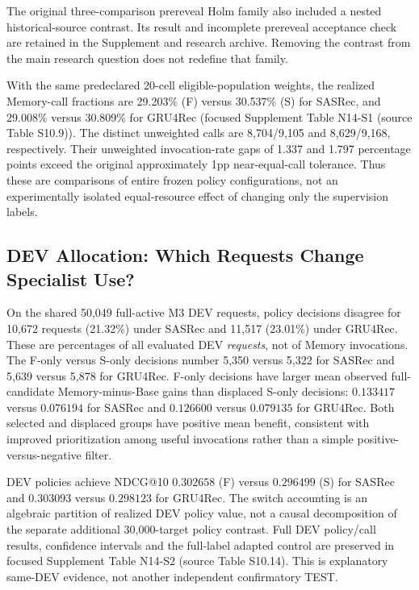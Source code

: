 \documentclass[preprint,12pt]{elsarticle}
\begin{document}
The original three-comparison prereveal Holm family also included a nested historical-source contrast. Its result and incomplete prereveal acceptance check are retained in the Supplement and research archive. Removing the contrast from the main research question does not redefine that family.

With the same predeclared 20-cell eligible-population weights, the realized Memory-call fractions are 29.203\% (F) versus 30.537\% (S) for SASRec, and 29.008\% versus 30.809\% for GRU4Rec (focused Supplement Table N14-S1 (source Table S10.9)). The distinct unweighted calls are 8,704/9,105 and 8,629/9,168, respectively. Their unweighted invocation-rate gaps of 1.337 and 1.797 percentage points exceed the original approximately 1pp near-equal-call tolerance. Thus these are comparisons of entire frozen policy configurations, not an experimentally isolated equal-resource effect of changing only the supervision labels.

\subsection{DEV Allocation: Which Requests Change Specialist Use?}
\label{sec:results-allocation}

On the shared 50,049 full-active M3 DEV requests, policy decisions disagree for 10,672 requests (21.32\%) under SASRec and 11,517 (23.01\%) under GRU4Rec. These are percentages of all evaluated DEV \emph{requests}, not of Memory invocations. The F-only versus S-only decisions number 5,350 versus 5,322 for SASRec and 5,639 versus 5,878 for GRU4Rec. F-only decisions have larger mean observed full-candidate Memory-minus-Base gains than displaced S-only decisions: $0.133417$ versus $0.076194$ for SASRec and $0.126600$ versus $0.079135$ for GRU4Rec. Both selected and displaced groups have positive mean benefit, consistent with improved prioritization among useful invocations rather than a simple positive-versus-negative filter.

DEV policies achieve NDCG@10 $0.302658$ (F) versus $0.296499$ (S) for SASRec and $0.303093$ versus $0.298123$ for GRU4Rec. The switch accounting is an algebraic partition of realized DEV policy value, not a causal decomposition of the separate additional 30,000-target policy contrast. Full DEV policy/call results, confidence intervals and the full-label adapted control are preserved in focused Supplement Table N14-S2 (source Table S10.14). This is explanatory same-DEV evidence, not another independent confirmatory TEST.
\end{document}
